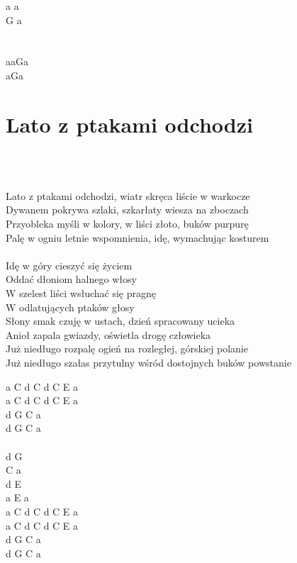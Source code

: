 \documentclass[a5paper, 10pt]{book}
\begin{document}
\begin{minipage}[t]{0.1\textwidth}
a a\\
G a\\
~\\
~\\

aaGa \\ aGa\\

\end{minipage}

\newpage
\section{Lato z ptakami odchodzi}\textcolor{lightgray}{\textit{}}\\~\\
\begin{minipage}[t]{0.8\textwidth}
Lato z ptakami odchodzi, wiatr skręca liście w warkocze\\
Dywanem pokrywa szlaki, szkarłaty wiesza na zboczach\\
Przyobleka myśli w kolory, w liści złoto, buków purpurę\\
Palę w ogniu letnie wspomnienia, idę, wymachując kosturem\\
\\
\hspace*{5mm}Idę w góry cieszyć się życiem\\
\hspace*{5mm}Oddać dłoniom halnego włosy\\
\hspace*{5mm}W szelest liści wsłuchać się pragnę\\
\hspace*{5mm}W odlatujących ptaków głosy\\

Słony smak czuję w ustach, dzień spracowany ucieka\\
Anioł zapala gwiazdy, oświetla drogę człowieka\\
Już niedługo rozpalę ogień na rozległej, górskiej polanie\\
Już niedługo szałas przytulny wśród dostojnych buków powstanie\\

\end{minipage}
\begin{minipage}[t]{0.2\textwidth}
a C d C d C E a\\
a C d C d C E a\\
 d G C a \\ 
 d G C a \\ 
\\
 d G\\
 C a\\
 d E\\
a E a\\

a C d C d C E a\\
a C d C d C E a\\
 d G C a \\ 
 d G C a \\
\end{minipage}
\end{document}
